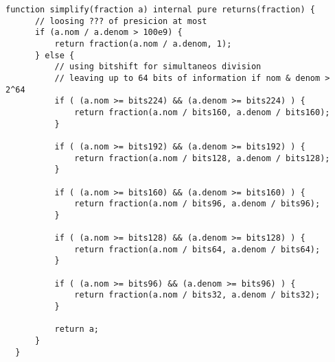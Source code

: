 \begin{lstlisting}[firstnumber=69]
  function simplify(fraction a) internal pure returns(fraction) {
      // loosing ??? of presicion at most
      if (a.nom / a.denom > 100e9) {
          return fraction(a.nom / a.denom, 1);
      } else {
          // using bitshift for simultaneos division
          // leaving up to 64 bits of information if nom & denom > 2^64
          if ( (a.nom >= bits224) && (a.denom >= bits224) ) {
              return fraction(a.nom / bits160, a.denom / bits160);
          }

          if ( (a.nom >= bits192) && (a.denom >= bits192) ) {
              return fraction(a.nom / bits128, a.denom / bits128);
          }

          if ( (a.nom >= bits160) && (a.denom >= bits160) ) {
              return fraction(a.nom / bits96, a.denom / bits96);
          }

          if ( (a.nom >= bits128) && (a.denom >= bits128) ) {
              return fraction(a.nom / bits64, a.denom / bits64);
          }

          if ( (a.nom >= bits96) && (a.denom >= bits96) ) {
              return fraction(a.nom / bits32, a.denom / bits32);
          }

          return a;
      }
  }
\end{lstlisting}

